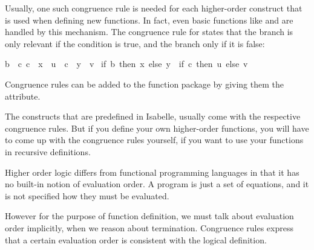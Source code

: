 \begin{isabellebody}
\begin{isamarkuptext}
  Usually, one such congruence rule is
  needed for each higher-order construct that is used when defining
  new functions. In fact, even basic functions like  and  are handled by this mechanism. The congruence
  rule for  states that the  branch is only
  relevant if the condition is true, and the  branch only if it
  is false:

  \begin{isabelle}%
{\isasymlbrakk}{\isacharquery}b\ {\isacharequal}\ {\isacharquery}c{\isacharsemicolon}\ {\isacharquery}c\ {\isasymLongrightarrow}\ {\isacharquery}x\ {\isacharequal}\ {\isacharquery}u{\isacharsemicolon}\ {\isasymnot}\ {\isacharquery}c\ {\isasymLongrightarrow}\ {\isacharquery}y\ {\isacharequal}\ {\isacharquery}v{\isasymrbrakk}\isanewline
{\isasymLongrightarrow}\ {\isacharparenleft}if\ {\isacharquery}b\ then\ {\isacharquery}x\ else\ {\isacharquery}y{\isacharparenright}\ {\isacharequal}\ {\isacharparenleft}if\ {\isacharquery}c\ then\ {\isacharquery}u\ else\ {\isacharquery}v{\isacharparenright}%
\end{isabelle}
  
  Congruence rules can be added to the
  function package by giving them the  attribute.

  The constructs that are predefined in Isabelle, usually
  come with the respective congruence rules.
  But if you define your own higher-order functions, you will have to
  come up with the congruence rules yourself, if you want to use your
  functions in recursive definitions.%
\end{isamarkuptext}%
\isamarkuptrue%
%
\isamarkuptrue%
%
\begin{isamarkuptext}%
Higher order logic differs from functional programming languages in
  that it has no built-in notion of evaluation order. A program is
  just a set of equations, and it is not specified how they must be
  evaluated. 

  However for the purpose of function definition, we must talk about
  evaluation order implicitly, when we reason about termination.
  Congruence rules express that a certain evaluation order is
  consistent with the logical definition. 


\end{isamarkuptext}
\end{isabellebody}
